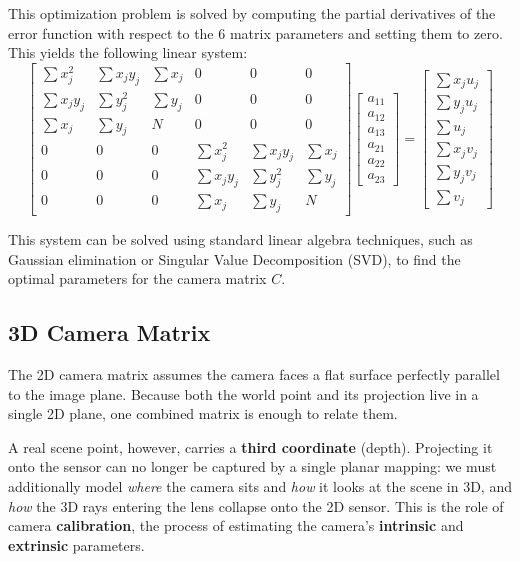 This optimization problem is solved by computing the partial derivatives of the error function with respect to the 6 matrix parameters and setting them to zero. This yields the following linear system:
$$\begin{bmatrix} 
\sum x_j^2 & \sum x_j y_j & \sum x_j & 0 & 0 & 0 \\ 
\sum x_j y_j & \sum y_j^2 & \sum y_j & 0 & 0 & 0 \\ 
\sum x_j & \sum y_j & N & 0 & 0 & 0 \\ 
0 & 0 & 0 & \sum x_j^2 & \sum x_j y_j & \sum x_j \\ 
0 & 0 & 0 & \sum x_j y_j & \sum y_j^2 & \sum y_j \\ 
0 & 0 & 0 & \sum x_j & \sum y_j & N 
\end{bmatrix} 
\begin{bmatrix} a_{11} \\ a_{12} \\ a_{13} \\ a_{21} \\ a_{22} \\ a_{23} \end{bmatrix} = 
\begin{bmatrix} \sum x_j u_j \\ \sum y_j u_j \\ \sum u_j \\ \sum x_j v_j \\ \sum y_j v_j \\ \sum v_j \end{bmatrix}$$

This system can be solved using standard linear algebra techniques, such as Gaussian elimination or Singular Value Decomposition (SVD), to find the optimal parameters for the camera matrix $C$.

\subsection{3D Camera Matrix}
The 2D camera matrix assumes the camera faces a flat surface perfectly parallel to the image plane.
Because both the world point and its projection live in a single 2D plane, one combined matrix is enough to relate them.

A real scene point, however, carries a \textbf{third coordinate} (depth). Projecting it onto the sensor can no longer be captured by a single planar mapping: we must additionally model \emph{where} the camera sits and \emph{how} it looks at the scene in 3D, and \emph{how} the 3D rays entering the lens collapse onto the 2D sensor. This is the role of camera \textbf{calibration}, the process of estimating the camera's \textbf{intrinsic} and \textbf{extrinsic} parameters.

